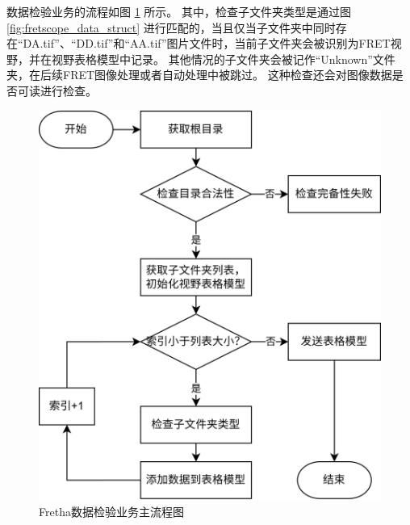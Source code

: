 数据检验业务的流程如图 \ref{fig:fretha_data_check_flow} 所示。
其中，检查子文件夹类型是通过图 \ref{fig:fretscope_data_struct} 进行匹配的，当且仅当子文件夹中同时存在“DA.tif”、“DD.tif”和“AA.tif”图片文件时，当前子文件夹会被识别为FRET视野，并在视野表格模型中记录。
其他情况的子文件夹会被记作“Unknown”文件夹，在后续FRET图像处理或者自动处理中被跳过。
这种检查还会对图像数据是否可读进行检查。
\begin{figure}[htbp]
    \centering
    \includegraphics[width=0.7\linewidth]{../figures/2/2_数据完备性检验业务.drawio.png}
    \caption{Fretha数据检验业务主流程图}
    \label{fig:fretha_data_check_flow}
\end{figure}
